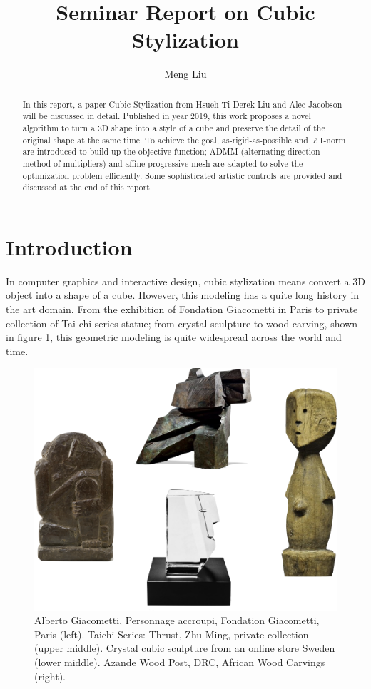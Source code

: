\documentclass[a4paper,10pt]{article}
\title{Seminar Report on Cubic Stylization} %
\author{Meng Liu} %
\institute{Robotics, Cognition, Intelligence\quad\quad Technische Universit\"{a}t M\"{u}nchen} %
\begin{document}
\maketitle

\begin{abstract}
In this report, a paper Cubic Stylization \cite{Liu:CubicStyle:2019} from Hsueh-Ti Derek Liu and Alec Jacobson will be discussed in detail. Published in year 2019, this work proposes a novel algorithm to turn a 3D shape into a style of a cube and preserve the detail of the original shape at the same time. To achieve the goal, as-rigid-as-possible and $\ell$1-norm are introduced to build up the objective function; ADMM (alternating direction method of multipliers) and affine progressive mesh are adapted to solve the optimization problem efficiently. Some sophisticated artistic controls are provided and discussed at the end of this report.

\end{abstract}
 
\section{Introduction}
In computer graphics and interactive design, cubic stylization means convert a 3D object into a shape of a cube. However, this modeling has a quite long history in the art domain. From the exhibition of Fondation Giacometti in Paris to private collection of Tai-chi series statue; from crystal sculpture to wood carving, shown in figure \ref{fig:arts}, this geometric modeling is quite widespread across the world and time.

	\begin{figure}
	    \includegraphics[width=0.45\linewidth]{figures/arts.png}
	    \caption{Alberto Giacometti, Personnage accroupi, Fondation Giacometti, Paris (left). Taichi Series: Thrust, Zhu Ming, private collection (upper middle). Crystal cubic sculpture from an online store Sweden (lower middle). Azande Wood Post, DRC, African Wood Carvings (right).}
	    \label{fig:arts}
	\end{figure}
	
\end{document}
